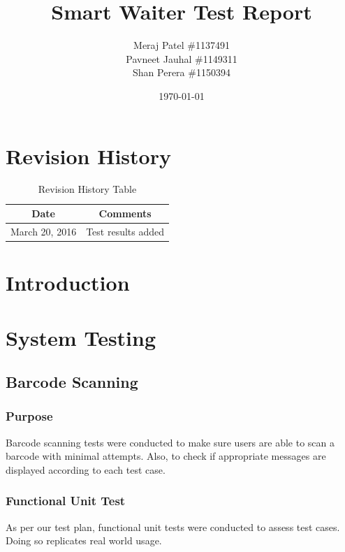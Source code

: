 \documentclass[12pt, titlepage]{article}
\begin{document}
\title{Smart Waiter Test Report} 
\author{Meraj Patel \#1137491 \\ Pavneet Jauhal \#1149311\\ Shan Perera \#1150394}
\date{\today}
\maketitle

\tableofcontents 

\listoftables

\begin{table}[H]
\section*{Revision History}
\begin{tabular}{|c|c|}
\hline
\textbf{Date}  & \textbf{Comments} \\ \hline
March 20, 2016 & Test results added \\
\hline
\end{tabular}
\caption{Revision History Table}
\end{table}

\section{Introduction}

\section{System Testing} 
\subsection{Barcode Scanning}

\subsubsection{Purpose}
Barcode scanning tests were conducted to make sure users are able to scan a barcode with minimal attempts. Also, to check if appropriate messages are displayed according to each test case.

\subsubsection{Functional Unit Test}
As per our test plan, functional unit tests were  conducted to assess test cases. Doing so replicates real world usage.
\end{document}
